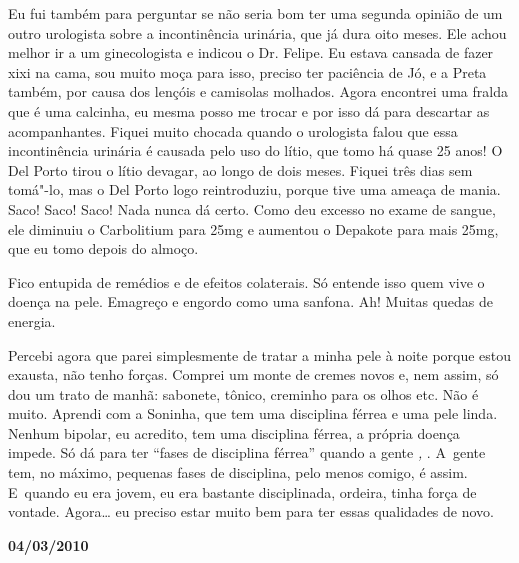 Eu fui também para perguntar se não seria bom ter uma segunda opinião de
um outro urologista sobre a incontinência urinária, que já dura oito
meses. Ele achou melhor ir a um ginecologista e indicou o Dr. Felipe. Eu
estava cansada de fazer xixi na cama, sou muito moça para isso, preciso
ter paciência de Jó, e a Preta também, por causa dos lençóis e camisolas
molhados. Agora encontrei uma fralda que é uma calcinha, eu mesma posso
me trocar e por isso dá para descartar as acompanhantes. Fiquei muito
chocada quando o urologista falou que essa incontinência urinária é
causada pelo uso do lítio, que tomo há quase 25 anos! O Del Porto tirou
o lítio devagar, ao longo de dois meses. Fiquei três dias sem tomá"-lo,
mas o Del Porto logo reintroduziu, porque tive uma ameaça de mania.
Saco! Saco! Saco! Nada nunca dá certo. Como deu excesso no exame de
sangue, ele diminuiu o Carbolitium para 25mg e aumentou o Depakote para
mais 25mg, que eu tomo depois do almoço.

Fico entupida de remédios e de efeitos colaterais. Só entende isso quem
vive o doença na pele. Emagreço e engordo como uma sanfona. Ah! Muitas
quedas de energia.

Percebi agora que parei simplesmente de tratar a minha pele à noite
porque estou exausta, não tenho forças. Comprei um monte de cremes novos
e, nem assim, só dou um trato de manhã: sabonete, tônico, creminho para
os olhos etc. Não é muito. Aprendi com a Soninha, que tem uma disciplina
férrea e uma pele linda. Nenhum bipolar, eu acredito, tem uma disciplina
férrea, a própria doença impede. Só dá para ter ``fases de disciplina
férrea'' quando a gente  \emph{,}  . A~gente tem, no
máximo, pequenas fases de disciplina, pelo menos comigo, é assim. E~quando eu era jovem, eu era bastante disciplinada, ordeira, tinha força
de vontade. Agora… eu preciso estar muito bem para ter essas
qualidades de novo.

\begin{center}\textbf{\asterisc{}}\end{center}


\begin{flushright}\textbf{04/03/2010}\end{flushright}


